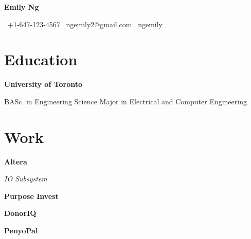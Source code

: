 \documentclass{article}
\makeatletter
\newcommand{\cvitem}[2]{\item[#1] \textbf{#2}}
\newcommand{\email}{\faEnvelope \, ngemily2@gmail.com }
\newcommand{\phone}{\faPhone \, +1-647-123-4567 }
\newcommand{\github}{\faGithub \, ngemily}
\makeatother
\begin{document}
{
\LARGE\bfseries Emily Ng \hrulefill
}

\phone \hfill \email \hfill \github

\section*{Education}

\begin{cvlist}
    \cvitem{2016}{University of Toronto}

        BASc. in Engineering Science Major in Electrical and Computer
        Engineering
\end{cvlist}

\section*{Work}

\begin{cvlist}
    \cvitem{2015}{Altera}

        \textit{IO Subsystem}

        \lipsum[1-2]
    \cvitem{2014}{Purpose Invest}

        \lipsum[1-2]
    \cvitem{2013}{DonorIQ}

        \lipsum
    \cvitem{2012}{PenyoPal}

        \lipsum
\end{cvlist}
\end{document}

